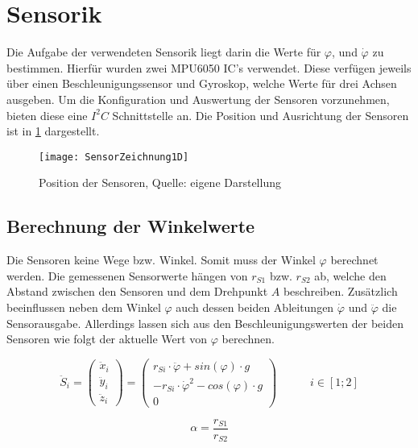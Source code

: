 \section{Sensorik}
Die Aufgabe der verwendeten Sensorik liegt darin die Werte für $\varphi$, und $\dot{\varphi}$ zu bestimmen. Hierfür wurden zwei MPU6050 IC's verwendet. Diese verfügen jeweils über einen Beschleunigungssensor und Gyroskop, welche Werte für drei Achsen ausgeben. Um die Konfiguration und Auswertung der Sensoren vorzunehmen, bieten diese eine $I^2C$ Schnittstelle an. Die Position und Ausrichtung der Sensoren ist in \ref{Position_Sensoren_pic} dargestellt.

\begin{figure}[h]
\label{Position_Sensoren_pic}
\texttt{[image: SensorZeichnung1D]}
\caption{Position der Sensoren, Quelle: eigene Darstellung}
\end{figure}

\subsection{Berechnung der Winkelwerte}
Die Sensoren keine Wege bzw. Winkel. Somit muss der Winkel $\varphi$ berechnet werden. Die gemessenen Sensorwerte hängen von $r_{S1}$ bzw. $r_{S2}$ ab, welche den Abstand zwischen den Sensoren und dem Drehpunkt $A$ beschreiben. Zusätzlich beeinflussen neben dem Winkel $\varphi$ auch dessen beiden Ableitungen $\dot{\varphi}$ und $\ddot{\varphi}$ die Sensorausgabe. Allerdings lassen sich aus den Beschleunigungswerten der beiden Sensoren wie folgt der aktuelle Wert von $\varphi$ berechnen.

\begin{equation}
\ddot{S}_i = 
\begin{pmatrix}
\ddot{x}_i \\ \ddot{y}_i \\ \ddot{z}_i
\end{pmatrix} =
\begin{pmatrix}
r_{Si} \cdot \ddot{\varphi} + sin(\varphi) \cdot g \\
- r_{Si} \cdot \dot{\varphi}^2 - cos(\varphi) \cdot g \\
0
\end{pmatrix}
\hspace{35pt}
i \in [1;2]
\end{equation}

\begin{equation}
\alpha = \frac{r_{S1}}{r_{S2}}
\end{equation}

